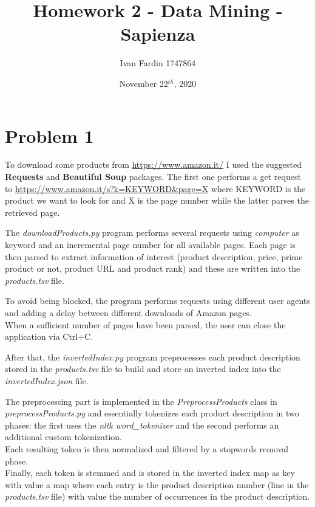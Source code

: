 \documentclass[11pt]{article}
\begin{document}
\title{Homework 2 - Data Mining - Sapienza}
\author{Ivan Fardin 1747864}
\date{November 22$^{th}$, 2020}

\maketitle

\tableofcontents

\newpage
\section{Problem 1}
To download some products from \url{https://www.amazon.it/} I used the suggested \textbf{Requests} and \textbf{Beautiful Soup} packages.
The first one performs a get request to \url{https://www.amazon.it/s?k=KEYWORD&page=X} where KEYWORD is the product we want to look for and X is the page number while the latter parses the retrieved page.

\bigskip
The \textit{downloadProducts.py} program performs several requests using \textit{computer} as keyword and
an incremental page number for all available pages.
Each page is then parsed to extract information of interest (product description, price, prime product or not, product URL and
 product rank) and these are written into the \textit{products.tsv} file.

\bigskip
To avoid being blocked, the program performs requests using different user agents and adding a delay between different downloads
of Amazon pages. \\
When a sufficient number of pages have been parsed, the user can close the application via Ctrl+C.

\bigskip
After that, the \textit{invertedIndex.py} program preprocesses each product description stored in the \textit{products.tsv} file
to build and store an inverted index into the \textit{invertedIndex.json} file.

\bigskip
The preprocessing part is implemented in the \textit{PreprocessProducts} class in \textit{preprocessProducts.py} and essentially
tokenizes each product description in two phases: the first uses the \textit{nltk word\_tokenizer} and the second performs an
additional custom tokenization. \\
Each resulting token is then normalized and filtered by a stopwords removal phase. \\
Finally, each token is stemmed and is stored in the inverted index map as key with value a map where each entry is the product
description number (line in the \textit{products.tsv} file) with value the number of occurrences in the product description.
\end{document}
